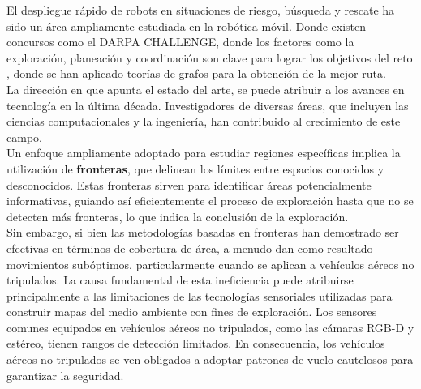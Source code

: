 \documentclass[sigconf]{acmart}
\begin{document}
El despliegue rápido de robots en situaciones de riesgo, búsqueda y rescate ha sido un área ampliamente estudiada en la robótica móvil. Donde existen concursos como el DARPA CHALLENGE, donde los factores como la exploración, planeación y coordinación son clave para lograr los objetivos del reto \cite{DARPA2022}, donde se han aplicado teorías de grafos para la obtención de la mejor ruta.\\


La dirección en que apunta el estado del arte, se puede atribuir a los avances en tecnología en la última década. Investigadores de diversas áreas, que incluyen las ciencias computacionales y la ingeniería, han contribuido al crecimiento de este campo.\\

Un enfoque ampliamente adoptado para estudiar regiones específicas implica la utilización de \textbf{fronteras}, que delinean los límites entre espacios conocidos y desconocidos. Estas fronteras sirven para identificar áreas potencialmente informativas, guiando así eficientemente el proceso de exploración hasta que no se detecten más fronteras, lo que indica la conclusión de la exploración.\\

Sin embargo, si bien las metodologías basadas en fronteras han demostrado ser efectivas en términos de cobertura de área, a menudo dan como resultado movimientos subóptimos, particularmente cuando se aplican a vehículos aéreos no tripulados. La causa fundamental de esta ineficiencia puede atribuirse principalmente a las limitaciones de las tecnologías sensoriales utilizadas para construir mapas del medio ambiente con fines de exploración. Los sensores comunes equipados en vehículos aéreos no tripulados, como las cámaras RGB-D y estéreo, tienen rangos de detección limitados. En consecuencia, los vehículos aéreos no tripulados se ven obligados a adoptar patrones de vuelo cautelosos para garantizar la seguridad.\\
\end{document}
